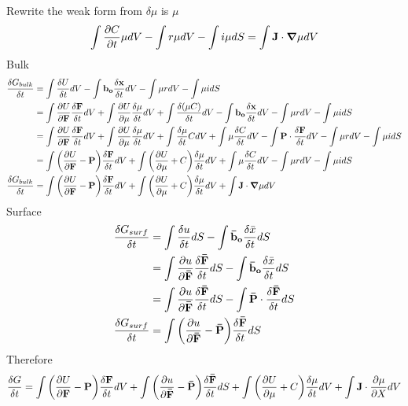 \documentclass[12pt,3p]{article}
\numberwithin{equation}{section}
\begin{document}
Rewrite the weak form from $\delta \mu$ is $\mu$
\begin{align*}
\int \pdv{C}{t}  \mu dV - \int r \mu dV - \int i \mu dS = \int \mathbf{J} \cdot \grad \mu dV
\end{align*}
Bulk 
\begin{align*}
 \frac{\delta G_{bulk}}{\delta t} &= \int \frac{\delta U}{\delta t} dV  - \int \mathbf{b_o} \frac{\delta \mathbf{x}}{\delta t} dV - \int \mu r dV - \int \mu i dS \\
 	&= \int \pdv{U}{\mathbf{F}} \frac{\delta \mathbf{F}}{\delta t} dV + \int \pdv{U}{\mu} \frac{\delta \mu}{\delta t} dV + \int \frac{\delta (\mu C)}{\delta t} dV - \int \mathbf{b_o} \frac{\delta \mathbf{x}}{\delta t} dV - \int \mu r dV - \int \mu i dS \\
	 &= \int \pdv{U}{\mathbf{F}} \frac{\delta \mathbf{F}}{\delta t} dV + \int \pdv{U}{\mu} \frac{\delta \mu}{\delta t} dV + \int \frac{\delta \mu}{\delta t} C dV + \int \mu \frac{\delta C}{\delta t} dV- \int \mathbf{P} \cdot \frac{\delta \mathbf{F}}{\delta t} dV - \int \mu r dV - \int \mu i dS \\
	 &= \int \bigg( \pdv{U}{\mathbf{F}} - \mathbf{P} \bigg) \frac{\delta \mathbf{F}}{\delta t} dV + \int \bigg( \pdv{U}{\mu} + C \bigg) \frac{\delta \mu}{\delta t} dV + \int \mu \frac{\delta C}{\delta t} dV - \int \mu r dV - \int \mu i dS \\
 \frac{\delta G_{bulk}}{\delta t} &= \int \bigg( \pdv{U}{\mathbf{F}} - \mathbf{P} \bigg) \frac{\delta \mathbf{F}}{\delta t} dV + \int \bigg( \pdv{U}{\mu} + C \bigg) \frac{\delta \mu}{\delta t} dV + \int \mathbf{J} \cdot \grad \mu dV
\end{align*}
Surface
\begin{align*}
\frac{\delta G_{surf}}{\delta t} &= \int \frac{\delta u}{\delta t} dS - \int \mathbf{\bar{b}_o} \frac{\delta \bar{x}}{\delta t} dS \\
	&= \int \pdv{u}{\mathbf{\bar{F}}} \frac{\delta \mathbf{\bar{F}}}{\delta t} dS - \int \mathbf{\bar{b}_o} \frac{\delta \bar{x}}{\delta t} dS \\
	&= \int \pdv{u}{\mathbf{\bar{F}}} \frac{\delta \mathbf{\bar{F}}}{\delta t} dS - \int \mathbf{\bar{P}} \cdot \frac{\delta \mathbf{\bar{F}}}{\delta t} dS \\
\frac{\delta G_{surf}}{\delta t} &= \int \bigg( \pdv{u}{\mathbf{\bar{F}}} - \mathbf{\bar{P}} \bigg)  \frac{\delta \mathbf{\bar{F}}}{\delta t} dS 
\end{align*}
Therefore 
\begin{align*}
\frac{\delta G}{\delta t} = \int \bigg( \pdv{U}{\mathbf{F}} - \mathbf{P} \bigg) \frac{\delta \mathbf{F}}{\delta t} dV + \int \bigg( \pdv{u}{\mathbf{\bar{F}}} - \mathbf{\bar{P}} \bigg)  \frac{\delta \mathbf{\bar{F}}}{\delta t} dS + \int \bigg( \pdv{U}{\mu} + C \bigg) \frac{\delta \mu}{\delta t} dV + \int \mathbf{J} \cdot \pdv{\mu}{X} dV
\end{align*}
\end{document}
